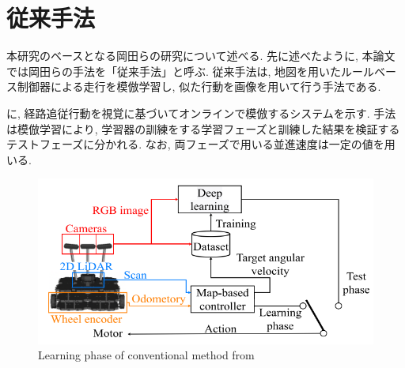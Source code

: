 
\section{従来手法}
本研究のベースとなる岡田らの研究について述べる. 先に述べたように, 本論文では岡田らの手法を「従来手法」と呼ぶ. 従来手法は, 地図を用いたルールベース制御器による走行を模倣学習し, 似た行動を画像を用いて行う手法である.\par
{}に, 経路追従行動を視覚に基づいてオンラインで模倣するシステムを示す. 手法は模倣学習により, 学習器の訓練をする学習フェーズと訓練した結果を検証するテストフェーズに分かれる. なお, 両フェーズで用いる並進速度は一定の値を用いる.

\vspace{3cm}

\begin{figure}[hbtp]
  \centering
 \includegraphics[keepaspectratio, scale=0.5]
      {images/imitation_sys.png}
 \caption{Learning phase of conventional method from \cite{mech}}
 \label{Fig:imitation_sys}
\end{figure}

\newpage

